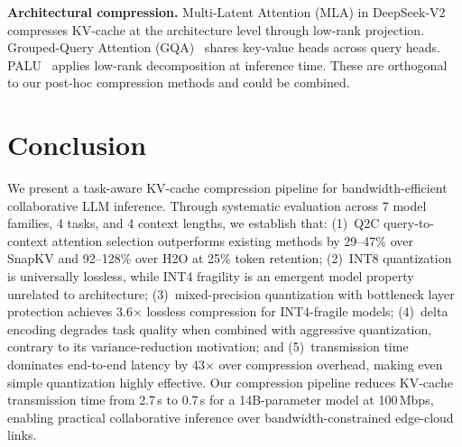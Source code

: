 \documentclass[conference]{IEEEtran}
\newcommand{\QtoC}{\textsc{Q2C}\xspace}
\begin{document}
\textbf{Architectural compression.}
Multi-Latent Attention (MLA) in DeepSeek-V2~\cite{deepseek} compresses KV-cache at the architecture level through low-rank projection.
Grouped-Query Attention (GQA)~\cite{gqa} shares key-value heads across query heads.
PALU~\cite{palu} applies low-rank decomposition at inference time.
These are orthogonal to our post-hoc compression methods and could be combined.


\section{Conclusion}
\label{sec:conclusion}

We present a task-aware KV-cache compression pipeline for bandwidth-efficient collaborative LLM inference.
Through systematic evaluation across 7 model families, 4 tasks, and 4 context lengths, we establish that:
(1)~\QtoC query-to-context attention selection outperforms existing methods by 29--47\% over SnapKV and 92--128\% over H2O at 25\% token retention;
(2)~INT8 quantization is universally lossless, while INT4 fragility is an emergent model property unrelated to architecture;
(3)~mixed-precision quantization with bottleneck layer protection achieves 3.6$\times$ lossless compression for INT4-fragile models;
(4)~delta encoding degrades task quality when combined with aggressive quantization, contrary to its variance-reduction motivation;
and (5)~transmission time dominates end-to-end latency by 43$\times$ over compression overhead, making even simple quantization highly effective.
Our compression pipeline reduces KV-cache transmission time from 2.7\,s to 0.7\,s for a 14B-parameter model at 100\,Mbps, enabling practical collaborative inference over bandwidth-constrained edge-cloud links.

\balance
\end{document}
